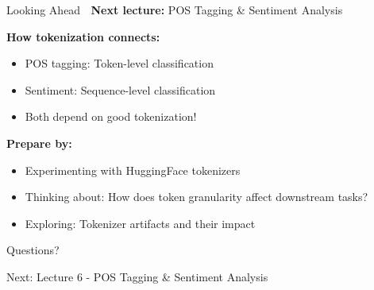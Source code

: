 \documentclass[aspectratio=169]{beamer}
\begin{document}
\begin{frame}[shrink=10]{Looking Ahead 🔮}
    \textbf{Next lecture:} POS Tagging \& Sentiment Analysis

    \vspace{0.5em}
    \textbf{How tokenization connects:}
    \begin{itemize}\setlength{\itemsep}{0pt}
        \item POS tagging: Token-level classification
        \item Sentiment: Sequence-level classification
        \item Both depend on good tokenization!
    \end{itemize}

    \vspace{1em}
    \textbf{Prepare by:}
    \begin{itemize}\setlength{\itemsep}{0pt}
        \item Experimenting with HuggingFace tokenizers
        \item Thinking about: How does token granularity affect downstream tasks?
        \item Exploring: Tokenizer artifacts and their impact
    \end{itemize}
\end{frame}

\begin{frame}[standout]
    Questions? 🤔

    \vspace{1em}

    \normalsize
    Next: Lecture 6 - POS Tagging \& Sentiment Analysis
\end{frame}
\end{document}
